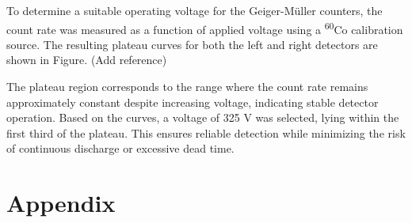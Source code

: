 \documentclass[12pt,a4paper]{article}
\begin{document}
To determine a suitable operating voltage for the Geiger-Müller counters, the count rate was measured as a function of applied voltage using a \textsuperscript{60}Co calibration source. The resulting plateau curves for both the left and right detectors are shown in Figure. (Add reference) 

The plateau region corresponds to the range where the count rate remains approximately constant despite increasing voltage, indicating stable detector operation. Based on the curves, a voltage of 325 V was selected, lying within the first third of the plateau. This ensures reliable detection while minimizing the risk of continuous discharge or excessive dead time.




\setcounter{secnumdepth}{0}

\printbibliography
\appendix
\section{Appendix}
\end{document}
